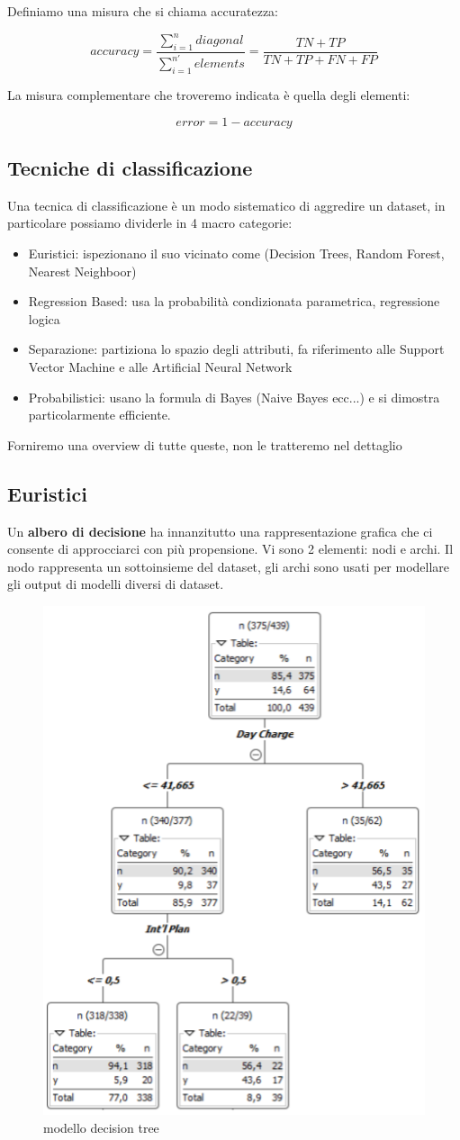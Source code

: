 \documentclass[12pt, a4paper,titlepage,openany]{article}
\begin{document}
Definiamo una misura che si chiama accuratezza:

\[accuracy = \frac{\sum_{i = 1}^{n} diagonal}{\sum_{i=1}^{n'}elements} = \frac{TN + TP}{TN + TP + FN + FP}\] 

La misura complementare che troveremo indicata è quella degli elementi:

\[error =  1 - accuracy\]

\subsection{Tecniche di classificazione}
Una tecnica di classificazione è un modo sistematico di aggredire un dataset, in particolare possiamo dividerle in 4 macro categorie:
\begin{itemize}
	\item Euristici: ispezionano il suo vicinato come (Decision Trees, Random Forest, Nearest Neighboor)
	\item Regression Based: usa la probabilità condizionata parametrica, regressione logica
	\item Separazione: partiziona lo spazio degli attributi, fa riferimento alle Support Vector Machine e alle Artificial Neural Network
	\item Probabilistici: usano la formula di Bayes (Naive Bayes ecc...) e si dimostra particolarmente efficiente.
\end{itemize}

Forniremo una overview di tutte queste, non le tratteremo nel dettaglio

\subsection{Euristici}

Un \textbf{albero di decisione} ha innanzitutto una rappresentazione grafica che ci consente di approcciarci con più propensione. Vi sono 2 elementi: nodi e archi. Il nodo rappresenta un sottoinsieme del dataset, gli archi sono usati per modellare gli output di modelli diversi di dataset.

\begin{figure}[h!]
	\centering
	\includegraphics[height=0.7 \linewidth]{pict/decision_tree.png}
	\caption{modello decision tree}
\end{figure}
\end{document}
